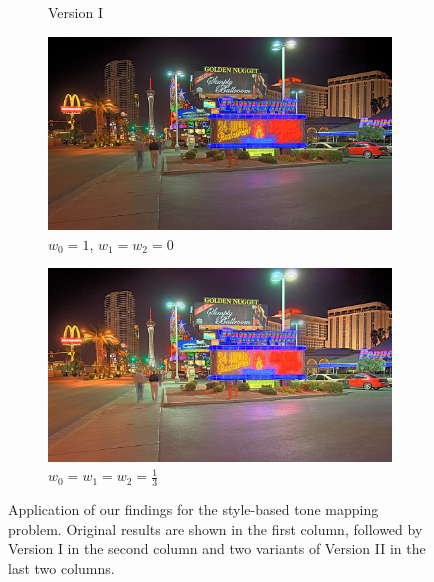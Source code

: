 \begin{landscape}
\begin{figure}
\begin{subfigure}[b]{0.40\textwidth}
    \caption{Version I}
    \label{FigStyle:VerI_peppermill}
\end{subfigure}\hfill
\begin{subfigure}[b]{0.40\textwidth}
    \centering
    \includegraphics[width=\textwidth]{figures/chapter5/style_based/Peppermill_hdrcandy_w0_1.png}
    \caption{$w_0 = 1$, $w_1 = w_2 = 0$}
   \label{FigStyle:VerIIa_peppermill}
\end{subfigure}\hfill
\begin{subfigure}[b]{0.40\textwidth}
    \centering
    \includegraphics[width=\textwidth]{figures/chapter5/style_based/Peppermill_hdrcandy_w0_w1_w2_small.jpg}
    \caption{$w_0 = w_1 = w_2 = \frac{1}{3}$}
    \label{FigStyle:VerIIb_peppermill}
\end{subfigure}\hfill
\caption{Application of our findings for the style-based tone mapping
    problem.  Original results are shown in the first column, followed
        by Version I in the second column and two variants of Version II
in the last two columns.}
\label{FigStyle}
\end{figure}
\end{landscape}
